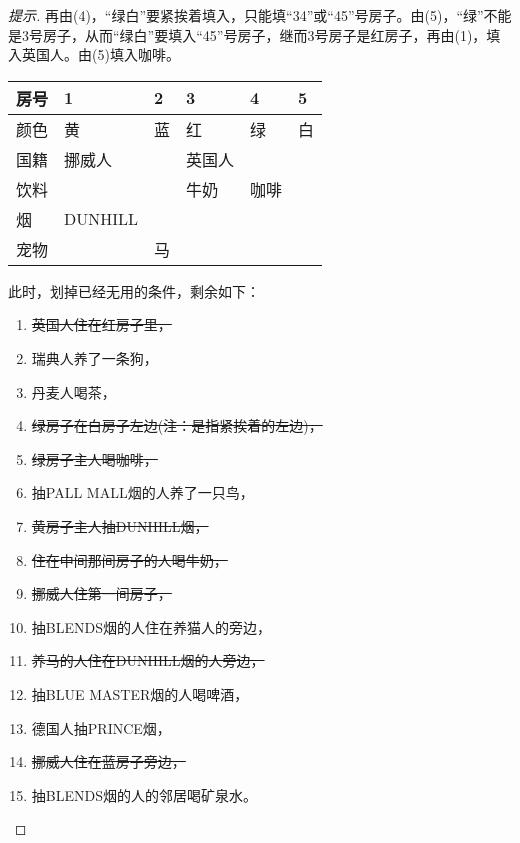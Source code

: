 \begin{proof}[提示]
    再由(4)，“绿白”要紧挨着填入，只能填“34”或“45”号房子。由(5)，“绿”不能是3号房子，从而“绿白”要填入“45”号房子，继而3号房子是红房子，再由(1)，填入英国人。由(5)填入咖啡。
    \begin{center}
      \renewcommand*{\arraystretch}{1.0}
      \begin{tabular}{l|l|l|l|l|l}
        \hline
        房号     & 1      & 2  & 3     & 4     & 5\\\hline
        颜色     & 黄     & 蓝 & 红    & 绿    &白\\\hline
        国籍     & 挪威人 &    & 英国人&       &  \\\hline
        饮料     &        &    & 牛奶  & 咖啡  &  \\\hline
        烟       & DUNHILL&    &       &       &  \\\hline
        宠物     &        & 马 &       &       &  \\
        \hline
      \end{tabular}
    \end{center}

    此时，划掉已经无用的条件，剩余如下：
    \begin{enumerate}
    \item \sout{英国人住在红房子里，}
    \item 瑞典人养了一条狗，
    \item 丹麦人喝茶，
    \item \sout{绿房子在白房子左边(注：是指紧挨着的左边)，}
    \item \sout{绿房子主人喝咖啡，}
    \item 抽PALL MALL烟的人养了一只鸟，
    \item \sout{黄房子主人抽DUNHILL烟，}
    \item \sout{住在中间那间房子的人喝牛奶，}
    \item \sout{挪威人住第一间房子，}
    \item 抽BLENDS烟的人住在养猫人的旁边，
    \item \sout{养马的人住在DUNHILL烟的人旁边，}
    \item 抽BLUE MASTER烟的人喝啤酒，
    \item 德国人抽PRINCE烟，
    \item \sout{挪威人住在蓝房子旁边，}
    \item 抽BLENDS烟的人的邻居喝矿泉水。
    \end{enumerate}


\end{proof}
